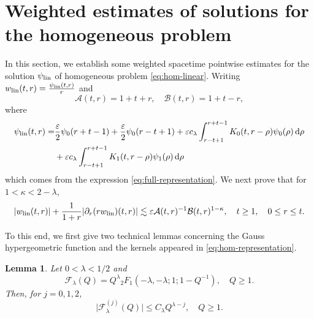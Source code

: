 \documentclass[11pt,twoside]{article}
\newcommand{\p}{\partial}
\newcommand{\ve}{\varepsilon}
\newcommand{\f}{\frac}
\newcommand{\Acal}{\mathcal A}
\newcommand{\Bcal}{\mathcal B}
\newcommand{\dd}{\,\mathrm{d}}
\theoremstyle{plain}
\newtheorem{lemma}[theorem]{Lemma}
\theoremstyle{definition}
\theoremstyle{remark}
\numberwithin{equation}{section}
\begin{document}
\section{Weighted  estimates of solutions for the homogeneous problem}
\label{sec:linear-estimates}
In this section, we establish some weighted spacetime pointwise estimates for the
solution $\psi_{\rm lin}$ of homogeneous  problem \eqref{eq:hom-linear}. Writing
$w_{\rm lin}(t,r)=\f{\psi_{\rm lin}(t,r)}{r}$ and
\[
\Acal(t,r)=1+t+r,\quad \Bcal(t,r)=1+t-r,
\]
where 
\begin{equation*}
\begin{aligned}
\psi_{\rm lin}(t,r)=&\f{\ve}{2}\psi_0(r+t-1)
+\f{\ve}{2}\psi_0(r-t+1)
+\ve c_\lambda\int_{r-t+1}^{r+t-1}
K_0(t,r-\rho)\psi_0(\rho)\dd\rho\\
&+\ve c_\lambda\int_{r-t+1}^{r+t-1}
K_1(t,r-\rho)\psi_1(\rho)\dd\rho
\end{aligned}
\end{equation*} 
which comes from the expression \eqref{eq:full-representation}.
We next prove that for $1<\kappa<2-\lambda$,
\begin{equation}\label{YHC-05}
|w_{\rm lin}(t,r)|
+\f{1}{1+r}|\p_r(rw_{\rm lin})(t,r)|
\lesssim
\ve\Acal(t,r)^{-1}\Bcal(t,r)^{1-\kappa},
\quad t\geq1,\quad 0\leq r\leq t.
\end{equation}

To this end, we first give two technical lemmas concerning  the
Gauss hypergeometric function and the kernels appeared in
\eqref{eq:hom-representation}.



\begin{lemma}
\label{lem:Phi}
Let $0<\lambda<1/2$ and
\begin{equation}\label{QQ-19'}
\mathcal F_\lambda(Q)
=
Q^\lambda
{}_2F_1\left(
-\lambda,-\lambda;1;1-Q^{-1}
\right),
\quad Q\geq1.
\end{equation}
Then, for $j=0,1,2$,
\begin{equation}\label{QQ-19}
\big|
\mathcal F_\lambda^{(j)}(Q)
\big|
\leq
C_\lambda Q^{\lambda-j},
\quad Q\geq1.
\end{equation}
\end{lemma}
\end{document}
